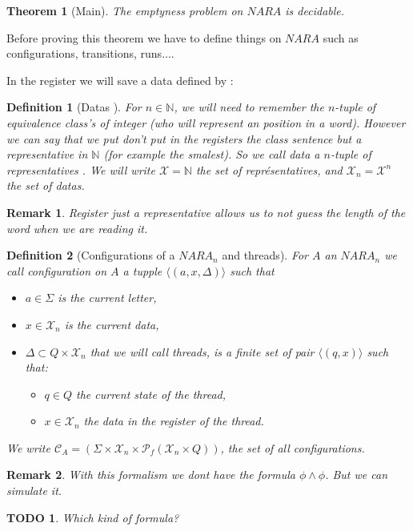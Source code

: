 \documentclass[a4paper,10pt]{report}
\newtheorem{thr}{Theorem} %
\newtheorem{df}{Definition}
\newtheorem{rk}{Remark}
\newtheorem{td}{TODO}
\newcommand{\C}{\mathcal{C}_{A}}
\newcommand{\Xa}{\mathcal{X}}
\newcommand{\X}{\mathcal{X}_{n}}
\begin{document}
\begin{thr}[Main]
  \label{main}
 The emptyness problem on $NARA$ is decidable.
\end{thr}


Before proving this theorem we have to define things on $NARA$ such as configurations, transitions, runs....


In the register we will save a data defined by :  
\begin{df}[Datas ]
  For $n\in \mathbb N$, we will need to remember the $n$-tuple of equivalence class's of integer (who will represent an position in a word).
  However we can say that we put don't put in the registers the class sentence but a representative in $\mathbb N$ (for example the smalest).
  So we call data a $n$-tuple of representatives .
  We will write $\Xa = \mathbb N$ the set of représentatives, and $\X = \Xa^n$ the set of datas.
\end{df}

\begin{rk}
 Register just a representative allows us to not guess the length of the word when we are reading it.
\end{rk}


\begin{df}[Configurations of a $NARA_n$ and threads]
For $A$ an $NARA_n$ we call configuration on $A$ a tupple  
 $\langle  (a ,x, \Delta  )  \rangle$
 such that 
  \begin{itemize}
    \item $a \in \Sigma$ is the current letter, 
    \item $x\in  \X$ is the current data, 
    \item $\Delta \subset Q \times \X$ that we will call threads, is a finite set of pair  
    $\langle (q,x)  \rangle$ such that:
      \begin{itemize}
	\item $q \in Q$ the current state of the thread,
	\item $x\in  \X $ the data in the register of the thread.
      \end{itemize}
   \end{itemize}
 We write $\C = ( \Sigma \times \X \times \mathcal{P}_f(\X \times Q))$, the set of all configurations.
\end{df}

\begin{rk}
  With this formalism we dont have the formula $ \phi \wedge \phi$. But we can simulate it.
\end{rk}
\begin{td}
  Which kind of formula?
\end{td}
\end{document}
